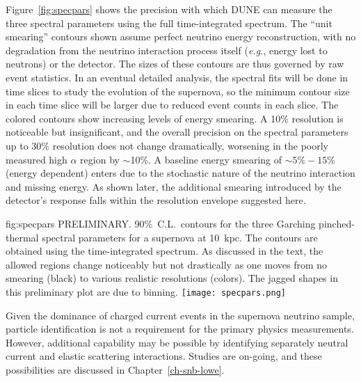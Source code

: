 Figure~\ref{fig:specpars} shows the precision with which DUNE
can measure the three spectral parameters using the full
time-integrated spectrum.  The ``unit smearing'' contours
shown assume perfect neutrino energy reconstruction, with
no degradation from the neutrino interaction process itself
({\em e.g.}, energy lost to neutrons) or the detector.
The sizes of these contours are thus governed by raw event
statistics.  In an eventual detailed analysis, the spectral
fits will be done in time slices to study the evolution of
the supernova, so the minimum contour size in each time slice
will be larger due to reduced event counts in each slice.
The colored contours show increasing levels of energy smearing.
A 10\% resolution is noticeable but insignificant, and the
overall precision on the spectral parameters up to 30\%
resolution does not change dramatically, worsening in the
poorly measured high $\alpha$ region by $\sim$10\%.
A baseline energy smearing of $\mathord{\sim}5\% - 15\%$
(energy dependent) enters due to the stochastic nature of
the neutrino interaction and missing energy.  As shown later,
the additional smearing introduced by the detector's response
falls within the resolution envelope suggested here.

\begin{dunefigure}
{fig:specpars}
{PRELIMINARY. 90\%~C.L.\ contours for the three
Garching pinched-thermal spectral parameters for a supernova
at 10~kpc.  The contours are obtained using the time-integrated
spectrum.  As discussed in the text, the allowed regions
change noticeably but not drastically as one moves from
no smearing (black) to various realistic resolutions (colors).
The jagged shapes in this preliminary plot are due to binning.}
  \texttt{[image: specpars.png]}
\end{dunefigure}

Given the dominance of \nue{} charged current events in the
supernova neutrino sample, particle identification is not a
requirement for the primary physics measurements.  However,
additional capability may be possible by identifying separately
neutral current and elastic scattering interactions.  Studies
are on-going, and these possibilities are discussed in 
Chapter~\ref{ch-snb-lowe}.

